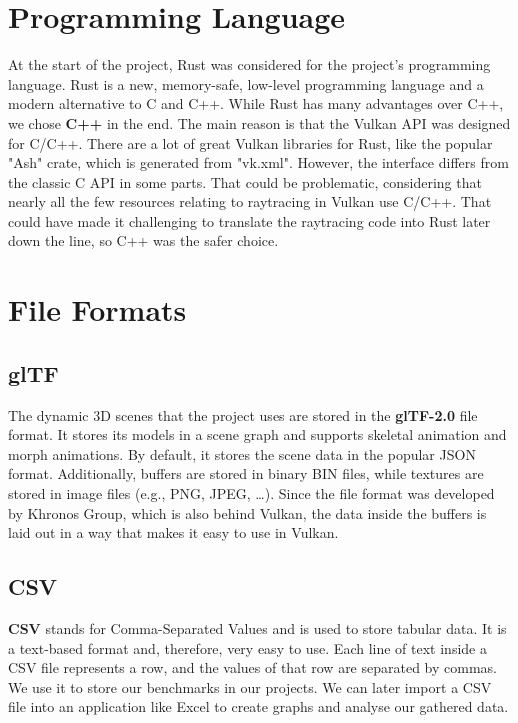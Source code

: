 \section{Programming Language}

At the start of the project, Rust was considered for the project's programming language. Rust is a new, memory-safe, low-level programming language and a modern alternative to C and C++. While Rust has many advantages over C++, we chose \textbf{C++} in the end. The main reason is that the Vulkan API was designed for C/C++. There are a lot of great Vulkan libraries for Rust, like the popular "Ash" crate, which is generated from "vk.xml". However, the interface differs from the classic C API in some parts. That could be problematic, considering that nearly all the few resources relating to raytracing in Vulkan use C/C++. That could have made it challenging to translate the raytracing code into Rust later down the line, so C++ was the safer choice.

\section{File Formats}

\subsection{glTF}\label{subsec:gltf}

The dynamic 3D scenes that the project uses are stored in the \textbf{glTF-2.0} \parencite{gltf-spec} file format. It stores its models in a scene graph and supports skeletal animation and morph animations. By default, it stores the scene data in the popular JSON format. Additionally, buffers are stored in binary BIN files, while textures are stored in image files (e.g., PNG, JPEG, …). Since the file format was developed by Khronos Group, which is also behind Vulkan, the data inside the buffers is laid out in a way that makes it easy to use in Vulkan.

\subsection{CSV}

\textbf{CSV} \parencite{csv} stands for Comma-Separated Values and is used to store tabular data. It is a text-based format and, therefore, very easy to use. Each line of text inside a CSV file represents a row, and the values of that row are separated by commas. We use it to store our benchmarks in our projects. We can later import a CSV file into an application like Excel to create graphs and analyse our gathered data.

